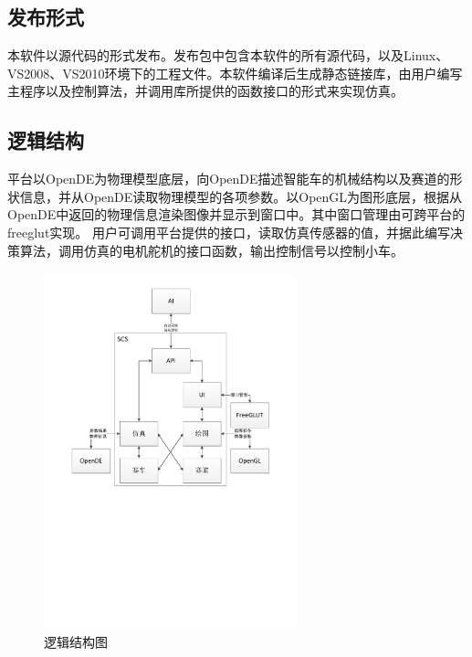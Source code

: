 \documentclass[titlepage,a4paper]{ctexart}
\begin{document}
\subsection{发布形式}
本软件以源代码的形式发布。发布包中包含本软件的所有源代码，以及Linux、VS2008、VS2010环境下的工程文件。本软件编译后生成静态链接库，由用户编写主程序以及控制算法，并调用库所提供的函数接口的形式来实现仿真。

\subsection{逻辑结构}
平台以OpenDE为物理模型底层，向OpenDE描述智能车的机械结构以及赛道的形状信息，并从OpenDE读取物理模型的各项参数。以OpenGL为图形底层，根据从OpenDE中返回的物理信息渲染图像并显示到窗口中。其中窗口管理由可跨平台的freeglut实现。
用户可调用平台提供的接口，读取仿真传感器的值，并据此编写决策算法，调用仿真的电机舵机的接口函数，输出控制信号以控制小车。
\begin{figure}[!htbp]
\centering
\includegraphics[width=0.65\textwidth]{logic.pdf}
\caption{逻辑结构图}
\end{figure}
\end{document}

